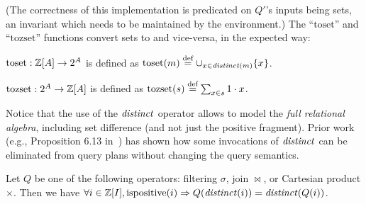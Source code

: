(The correctness of
this implementation is predicated on $Q'$'s inputs being
sets, an invariant which needs to be maintained by the environment.) 
The ``$\mbox{toset}$'' and ``$\mbox{tozset}$'' functions convert sets to \zrs and 
vice-versa, in the expected way:

$\mbox{toset}: \mathbb{Z}[A] \to 2^A$ is defined as $\mbox{toset}(m) \stackrel{\textrm{\scriptsize def}}{=} \cup_{x \in \mathit{distinct}(m)} \{ x \}$.

$\mbox{tozset}: 2^A \to \mathbb{Z}[A]$ is defined as $\mbox{tozset}(s) \stackrel{\textrm{\scriptsize def}}{=} \sum_{x \in s} 1 \cdot x$.


Notice that the use of the $\mathit{distinct}$ operator allows \dbsp to model
the \emph{full relational algebra}, including set difference (and not just the positive
fragment).  Prior work (e.g., Proposition 6.13 in~\cite{green-tcs11}) has shown
how some invocations of $\mathit{distinct}$ can be eliminated from query plans 
without changing the query semantics.

\begin{proposition}\label{prop-distinct-delay}
Let $Q$ be one of the following \zrs operators: filtering $\sigma$,
join $\bowtie$, or Cartesian product $\times$.
Then we have $\forall i \in \mathbb{Z}[I], \mbox{ispositive}(i) \Rightarrow Q(\mathit{distinct}(i)) = \mathit{distinct}(Q(i))$.
\end{proposition}

\begin{comment}
\noindent
\begin{tabular}{m{3.5cm}m{.5cm}m{3.5cm}}
\begin{tikzpicture}[auto,>=latex]
  \node[] (input) {$i$};
  \node[block, right of=input, node distance=1.1cm] (distinct) {$\distinct$};
  \node[block, right of=distinct, node distance=1.2cm] (q) {$Q$};
  \node[right of=q] (output)  {$o$};
  \draw[->] (input) -- (distinct);
  \draw[->] (distinct) -- (q);
  \draw[->] (q) -- (output);
\end{tikzpicture}
&
$\cong$
&
\begin{tikzpicture}[auto,>=latex]
  \node[] (input) {$i$};
  \node[block, right of=input] (q) {$Q$};
  \node[block, right of=q, node distance=1.2cm] (distinct1) {$\distinct$};
  \node[right of=distinct1, node distance=1.2cm] (output)  {$o$};
  \draw[->] (input) -- (q);
  \draw[->] (q) -- (distinct1);
  \draw[->] (distinct1) -- (output);
\end{tikzpicture}
\end{tabular}

This rule allows us to delay the application of $\distinct$.
\end{comment}

